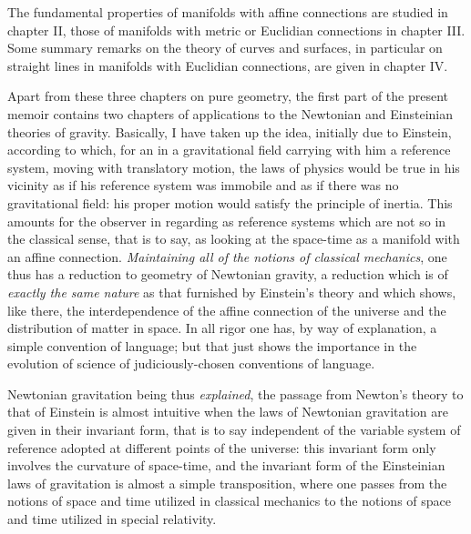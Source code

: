 \documentclass{report}
\begin{document}
The fundamental properties of manifolds with affine connections are studied in chapter II, those of manifolds with metric or Euclidian connections in chapter III. Some summary remarks on the theory of curves and surfaces, in particular on straight lines in manifolds with Euclidian connections, are given in chapter IV.

Apart from these three chapters on pure geometry, the first part of the present memoir contains two chapters of applications to the Newtonian and Einsteinian theories of gravity. Basically, I have taken up the idea, initially due to Einstein, according to which, for an  in a gravitational field carrying with him a reference system, moving with translatory motion, the laws of physics would be true in his vicinity as if his reference system was immobile and as if there was no gravitational field: his proper motion would satisfy the principle of inertia. This amounts for the observer in regarding as \textit{} reference systems which are not so in the classical sense, that is to say, as looking at the space-time as a manifold with an affine connection. \textit{Maintaining all of the notions of classical mechanics}, one thus has a reduction to geometry of Newtonian gravity, a reduction which is of \textit{exactly the same nature} as that furnished by Einstein's theory and which shows, like there, the interdependence of the affine connection of the universe and the distribution of matter in space. In all rigor one has, by way of explanation, a simple convention of language; but that just shows the importance in the evolution of science of judiciously-chosen conventions of language.

Newtonian gravitation being thus \textit{explained}, the passage from Newton's theory to that of Einstein is almost intuitive when the laws of Newtonian gravitation are given in their invariant form, that is to say independent of the variable system of reference adopted at different points of the universe: this invariant form only involves the curvature of space-time, and the invariant form of the Einsteinian laws of gravitation is almost a simple transposition, where one passes from the notions of space and time utilized in classical mechanics to the notions of space and time utilized in special relativity.
\end{document}
